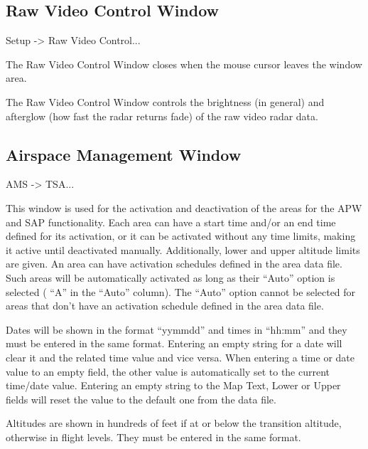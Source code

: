 \documentclass[a4paper,oneside,11pt]{memoir}
\begin{document}
\subsection{Raw Video Control Window}
\label{win:rvcw}

 Setup -> Raw Video Control...

\bigskip


The Raw Video Control Window closes when the mouse cursor leaves the window area.

\bigskip

The Raw Video Control Window controls the brightness (in general) and afterglow (how fast the radar returns fade) of the raw video radar data.

\subsection{Airspace Management Window}
\label{win:amw}

 AMS -> TSA...

\bigskip


This window is used for the activation and deactivation of the areas for the APW and SAP functionality. Each area can have a start time and/or an end time defined for its activation, or it can be activated without any time limits, making it active until deactivated manually. Additionally, lower and upper altitude limits are given. An area can have activation schedules defined in the area data file. Such areas will be automatically activated as long as their “Auto” option is selected ( “A” in the “Auto” column). The “Auto” option cannot be selected for areas that don’t have an activation schedule defined in the area data file.

\bigskip

Dates will be shown in the format “yymmdd” and times in “hh:mm” and they must be entered in the same format. Entering an empty string for a date will clear it and the related time value and vice versa. When entering a time or date value to an empty field, the other value is automatically set to the current time/date value. Entering an empty string to the Map Text, Lower or Upper fields will reset the value to the default one from the data file.

\bigskip

Altitudes are shown in hundreds of feet if at or below the transition altitude, otherwise in flight levels. They must be entered in the same format.
\end{document}
